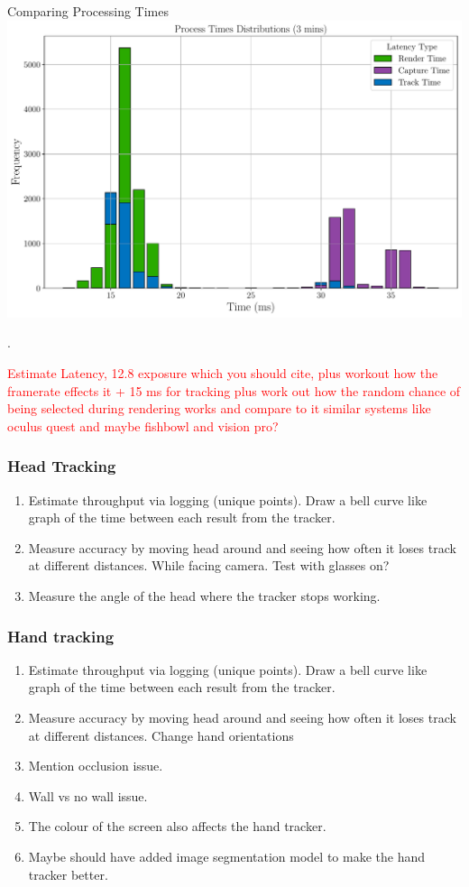 \begin{figureBox}[label={fig:process-times-distributions}, width=1.0\linewidth]{Comparing Processing Times}
	\includegraphics[width = 1.0\linewidth]{./evaluation/figures/process-times-distributions.pdf}
\end{figureBox}.

\textcolor{red}{Estimate Latency, 12.8 exposure which you should cite, plus workout how the framerate effects it + 15 ms for tracking plus work out how the random chance of being selected during rendering works and compare to it similar systems like oculus quest and maybe fishbowl and vision pro?} 

\subsubsection{Head Tracking}
\begin{enumerate}
	\item Estimate throughput via logging (unique points). Draw a bell curve like graph of the time between each result from the tracker.
	\item Measure accuracy by moving head around and seeing how often it loses track at different distances. While facing camera. Test with glasses on?
	\item Measure the angle of the head where the tracker stops working.  
\end{enumerate}

\subsubsection{Hand tracking}
\begin{enumerate}
	\item Estimate throughput via logging (unique points). Draw a bell curve like graph of the time between each result from the tracker.
	\item Measure accuracy by moving head around and seeing how often it loses track at different distances. Change hand orientations
	\item Mention occlusion issue. 
	\item Wall vs no wall issue. 
	\item The colour of the screen also affects the hand tracker. 
	\item Maybe should have added image segmentation model to make the hand tracker better.
\end{enumerate}

